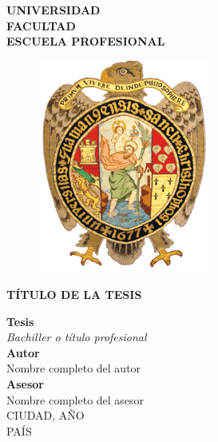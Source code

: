 \documentclass[12pt,a4paper]{article} %
\begin{document}
	\pagestyle{empty}
	\begin{titlepage}
		\begin{center}
			{\textbf{UNIVERSIDAD}}\\
			{\textbf{FACULTAD}}\\
			{\textbf{ESCUELA PROFESIONAL}}\\
			\vspace{2cm}
			\begin{figure}[h]
				\centering
				\includegraphics[height=7cm]{logo-unsch.png}
			\end{figure}
			\vspace{2mm}
			\begin{center}
				{\textbf{TÍTULO DE LA TESIS}}
			\end{center}
			\vspace{1cm}
				{\bf Tesis}\\
			\vspace{2mm}
				{\textit{Bachiller o título profesional}}\\
			\vspace{1cm}
				{\bf Autor}\\
			\vspace{2mm}
				{Nombre completo del autor}\\
			\vspace{4mm}
				{\bf Asesor}\\
			\vspace{2mm}
				{Nombre completo del asesor}\\
			\vspace{16mm}
				{CIUDAD, AÑO}\\
			\vspace{2mm}
				{PAÍS}
		\end{center}
	\end{titlepage}
	\newpage %
		\setcounter{page}{1}
		\pagestyle{fancy} %
		\tableofcontents %
		\textcolor{red!85}{\listoffigures}  %
		\textcolor{red!85}{\listoftables} %
	\newpage %
\end{document}
